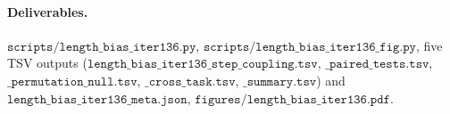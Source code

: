 \paragraph{Deliverables.}
$\texttt{scripts/length\_bias\_iter136.py}$, $\texttt{scripts/length\_bias\_iter136\_fig.py}$,
five TSV outputs ($\texttt{length\_bias\_iter136\_step\_coupling.tsv}$,
$\texttt{\_paired\_tests.tsv}$, $\texttt{\_permutation\_null.tsv}$,
$\texttt{\_cross\_task.tsv}$, $\texttt{\_summary.tsv}$) and
$\texttt{length\_bias\_iter136\_meta.json}$,
$\texttt{figures/length\_bias\_iter136.pdf}$.
